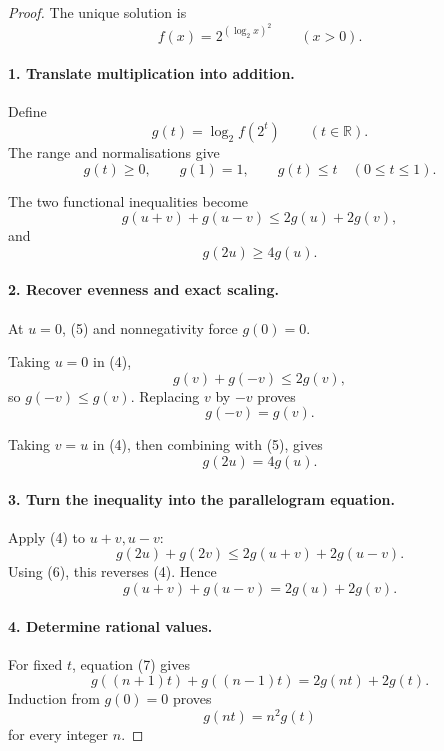 
\begin{dlsummary}[title={\bfseries Solution 60. The Squared-Logarithm Trap},breakable]

\begin{proof}
The unique solution is
\[
\boxed{
f(x)=2^{(\log_2 x)^2}
\qquad(x>0).
}
\]

\paragraph{1. Translate multiplication into addition.}

Define
\[
g(t)=\log_2 f(2^t)\qquad(t\in\mathbb R).
\]
The range and normalisations give
\[
g(t)\ge0,\qquad g(1)=1,\qquad
g(t)\le t\quad(0\le t\le1).
\tag{3}
\]

The two functional inequalities become
\[
g(u+v)+g(u-v)\le2g(u)+2g(v), \tag{4}
\]
and
\[
g(2u)\ge4g(u). \tag{5}
\]

\paragraph{2. Recover evenness and exact scaling.}

At \(u=0\), (5) and nonnegativity force \(g(0)=0\).

Taking \(u=0\) in (4),
\[
g(v)+g(-v)\le2g(v),
\]
so \(g(-v)\le g(v)\). Replacing \(v\) by \(-v\) proves
\[
g(-v)=g(v).
\]

Taking \(v=u\) in (4), then combining with (5), gives
\[
\boxed{g(2u)=4g(u).} \tag{6}
\]

\paragraph{3. Turn the inequality into the parallelogram equation.}

Apply (4) to \(u+v,u-v\):
\[
g(2u)+g(2v)\le2g(u+v)+2g(u-v).
\]
Using (6), this reverses (4). Hence
\[
\boxed{
g(u+v)+g(u-v)=2g(u)+2g(v).
}
\tag{7}
\]

\paragraph{4. Determine rational values.}

For fixed \(t\), equation (7) gives
\[
g((n+1)t)+g((n-1)t)=2g(nt)+2g(t).
\]
Induction from \(g(0)=0\) proves
\[
g(nt)=n^2g(t)
\]
for every integer \(n\).


\end{proof}
\end{dlsummary}
